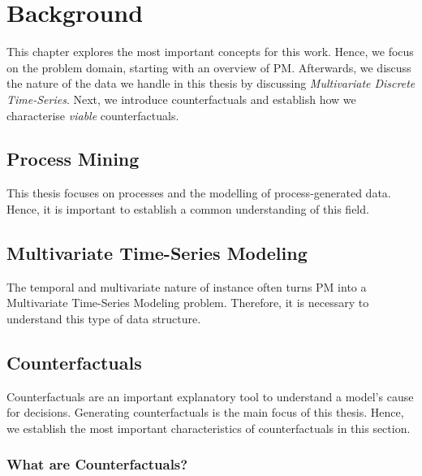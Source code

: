 \documentclass[12pt,a4paper]{report}
\begin{document}

\chapter{Background}
\label{ch:prereq}
This chapter explores the most important concepts for this work. Hence, we focus on the problem domain, starting with an overview of \Gls{PM}. Afterwards, we discuss the nature of the data we handle in this thesis by discussing \emph{Multivariate Discrete Time-Series}. Next, we introduce counterfactuals and establish how we characterise \emph{viable} counterfactuals. 

\section{Process Mining}
\label{sec:process}
This thesis focuses on processes and the modelling of process-generated data. Hence, it is important to establish a common understanding of this field.


\section{Multivariate Time-Series Modeling}
\label{sec:sequences}
The temporal and multivariate nature of \gls{instance} often turns \Gls{PM} into a Multivariate Time-Series Modeling problem. Therefore, it is necessary to understand this type of data structure.



\section{Counterfactuals}
\label{sec:counterfactuals}
Counterfactuals are an important explanatory tool to understand a model's cause for decisions. Generating counterfactuals is the main focus of this thesis. Hence, we establish the most important characteristics of counterfactuals in this section.

\subsection{What are Counterfactuals?}


% 
\end{document}
